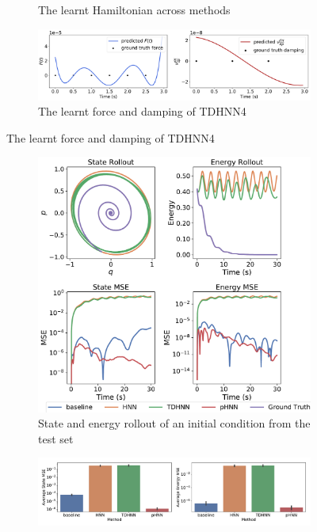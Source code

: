 \documentclass{article}
\begin{document}
\begin{figure}[!htb]
\begin{subfigure}[b]{0.48\textwidth}
\caption{The learnt Hamiltonian across methods}
\end{subfigure}
\begin{subfigure}[b]{0.48\textwidth}
\includegraphics[width=\textwidth]{figures/figures/mass_spring/1/mass_spring_dpdt_new_0.pdf}
\caption{The learnt force and damping of TDHNN4}
\end{subfigure}
\label{mspring_full}
\end{figure}
\begin{figure}[!htb]
\centering
\captionsetup{justification=centering}
\begin{subfigure}[b]{0.48\textwidth}
\includegraphics[width=\textwidth]{figures/figures/damped/1/damped_long_0.pdf}
\caption{State and energy rollout of an initial condition from the test set}
\end{subfigure}
\begin{subfigure}[b]{0.48\textwidth}
\includegraphics[width=\textwidth]{figures/figures/damped/1/damped_errors_0.pdf}

\end{subfigure}
\end{figure}
\end{document}
